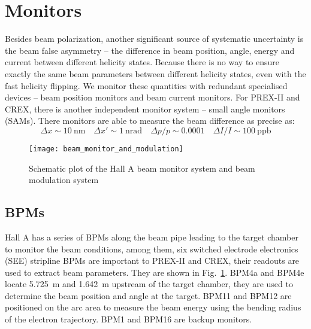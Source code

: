 \section{Monitors}
Besides beam polarization, another significant source of systematic uncertainty
is the beam false asymmetry -- the difference in beam position, angle, energy and
current between different helicity states. Because there is no way to ensure
exactly the same beam parameters between different helicity states, even with the fast
helicity flipping. We monitor these quantities with redundant specialised devices
-- beam position monitors and beam current monitors. For PREX-II
and CREX, there is another independent monitor system -- small angle monitors (SAMs).
There monitors are able to measure the beam difference as precise as:
$$ \Delta x \sim 10\ \mathrm{nm} \quad \Delta x' \sim 1\ \mathrm{nrad} \quad \Delta p/p \sim 0.0001 \quad \Delta I/I \sim 100 \ \mathrm{ppb} $$
\begin{figure}[!h]
    \centering
    \texttt{[image: beam\_monitor\_and\_modulation]}
    \caption{Schematic plot of the Hall A beam monitor system and beam modulation system}
    \label{fig:hall_a_monitors_and_modulation}
\end{figure}

\begin{comment}
    \begin{itemize}
	\item beam correlations
	\item monitor precision (resolution): double difference width
	\item noise
	\item pedestal: calibration
	\item cross-correlation
    \end{itemize}
\end{comment}

\subsection{BPMs}
Hall A has a series of BPMs along the beam pipe leading to the target chamber
to monitor the beam conditions, among them, six switched electrode electronics (SEE) 
stripline BPMs are important to PREX-II and CREX, their readouts are used to 
extract beam parameters. They are shown in Fig.~\ref{fig:hall_a_monitors_and_modulation}. 
BPM4a and BPM4e locate 5.725~m and 1.642~m upstream of the target chamber, 
they are used to determine the beam position and angle at the target. BPM11 and BPM12
are positioned on the arc area to measure the beam energy using the bending 
radius of the electron trajectory. BPM1 and BPM16 are backup monitors.

